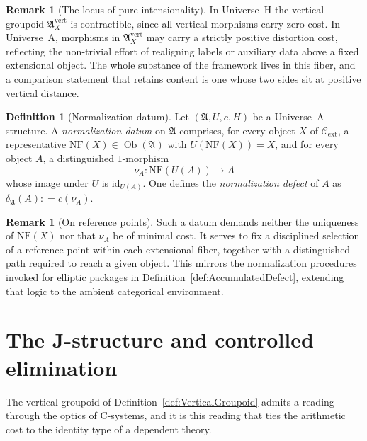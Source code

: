 \documentclass[10pt, reqno]{amsart}
\theoremstyle{plain}
\theoremstyle{definition}
\newtheorem{definition}[theorem]{Definition}
\newtheorem{remark}[theorem]{Remark}
\theoremstyle{plain}
\newcommand{\coloneqq}{\mathrel{\mathop:}=}
\begin{document}
\begin{remark}[The locus of pure intensionality]\label{rem:locus_pure_intensionality}
In Universe~H the vertical groupoid $\mathfrak{A}_X^{\mathrm{vert}}$ is contractible, since all vertical morphisms carry zero cost. In Universe~A, morphisms in $\mathfrak{A}_X^{\mathrm{vert}}$ may carry a strictly positive distortion cost, reflecting the non-trivial effort of realigning labels or auxiliary data above a fixed extensional object. The whole substance of the framework lives in this fiber, and a comparison statement that retains content is one whose two sides sit at positive vertical distance.
\end{remark}

\begin{definition}[Normalization datum]\label{def:UniverseANormalization}
Let $(\mathfrak{A},U,c,H)$ be a Universe~A structure. A \emph{normalization datum} on $\mathfrak{A}$ comprises, for every object $X$ of $\mathcal{C}_{\mathrm{ext}}$, a representative $\mathrm{NF}(X) \in \operatorname{Ob}(\mathfrak{A})$ with $U(\mathrm{NF}(X)) = X$, and for every object $A$, a distinguished $1$-morphism
\[
  \nu_A \colon \mathrm{NF}(U(A)) \longrightarrow A
\]
whose image under $U$ is $\mathrm{id}_{U(A)}$. One defines the \emph{normalization defect} of $A$ as $\delta_{\mathfrak{A}}(A) \coloneqq c(\nu_A)$.
\end{definition}

\begin{remark}[On reference points]\label{rem:reference_points}
Such a datum demands neither the uniqueness of $\mathrm{NF}(X)$ nor that $\nu_A$ be of minimal cost. It serves to fix a disciplined selection of a reference point within each extensional fiber, together with a distinguished path required to reach a given object. This mirrors the normalization procedures invoked for elliptic packages in Definition~\ref{def:AccumulatedDefect}, extending that logic to the ambient categorical environment.
\end{remark}


\section{The J-structure and controlled elimination}\label{sec:Jstructure}

The vertical groupoid of Definition~\ref{def:VerticalGroupoid} admits a reading through the optics of C-systems, and it is this reading that ties the arithmetic cost to the identity type of a dependent theory.
\end{document}
